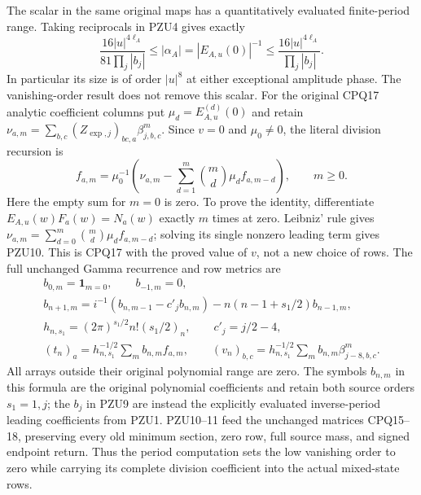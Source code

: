 The scalar in the same original maps has a quantitatively evaluated
finite-period range. Taking reciprocals in PZU4 gives exactly
\[
 \frac{16|u|^{4\ell_A}}{81\prod_j|b_j|}
 \le |\alpha_A|=|E_{A,u}(0)|^{-1}
 \le\frac{16|u|^{4\ell_A}}{\prod_j|b_j|}.
 \tag{PZU9}
\]
In particular its size is of order $|u|^8$ at either exceptional
amplitude phase. The vanishing-order result does not remove this
scalar. For the original CPQ17 analytic coefficient columns put
$\mu_d=E_{A,u}^{(d)}(0)$ and retain
$\nu_{a,m}=\sum_{b,c}(Z_{\exp,j})_{bc,a}\beta_{j,b,c}^{m}$.
Since $v=0$ and $\mu_0\ne0$, the literal division recursion is
\[
 \boxed{\quad
 f_{a,m}=\mu_0^{-1}\left(\nu_{a,m}
       -\sum_{d=1}^{m}\binom md\mu_d f_{a,m-d}\right),
 \qquad m\ge0.
 \quad}\tag{PZU10}
\]
Here the empty sum for $m=0$ is zero. To prove the identity,
differentiate $E_{A,u}(w)F_a(w)=N_a(w)$ exactly $m$ times at zero.
Leibniz' rule gives
$\nu_{a,m}=\sum_{d=0}^{m}\binom md\mu_d f_{a,m-d}$;
solving its single nonzero leading term gives PZU10. This is
CPQ17 with the proved value of $v$, not a new choice of rows.
The full unchanged Gamma recurrence and row metrics are
\[
 \begin{gathered}
 b_{0,m}=\mathbf1_{m=0},\qquad b_{-1,m}=0,\\
 b_{n+1,m}=i^{-1}(b_{n,m-1}-c'_j b_{n,m})
                  -n(n-1+s_1/2)b_{n-1,m},\\
 h_{n,s_1}=(2\pi)^{s_1/2}n!(s_1/2)_n,\qquad c'_j=j/2-4,\\
 (t_n)_a=h_{n,s_1}^{-1/2}\sum_m b_{n,m}f_{a,m},\qquad
 (v_n)_{b,c}=h_{n,s_1}^{-1/2}
                    \sum_m b_{n,m}\beta_{j-8,b,c}^{m}.
 \end{gathered}\tag{PZU11}
\]
All arrays outside their original polynomial range are zero.
The symbols $b_{n,m}$ in this formula are the original polynomial
coefficients and retain both source orders $s_1=1,j$; the $b_j$ in
PZU9 are instead the explicitly evaluated inverse-period leading
coefficients from PZU1. PZU10--11 feed the unchanged matrices
CPQ15--18, preserving every old minimum section, zero row, full
source mass, and signed endpoint return. Thus the period computation
sets the low vanishing order to zero while carrying its complete
division coefficient into the actual mixed-state rows.

